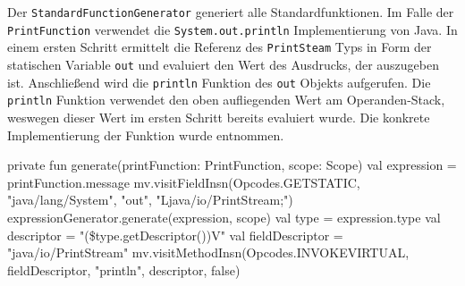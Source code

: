Der \texttt{StandardFunctionGenerator} generiert alle Standardfunktionen. Im Falle der \texttt{PrintFunction} verwendet \toya die \texttt{System.out.println} Implementierung von Java. In einem ersten Schritt ermittelt \toya die Referenz des \texttt{PrintSteam} Typs in Form der statischen Variable \texttt{out} und evaluiert \toya den Wert des Ausdrucks, der auszugeben ist. Anschließend wird die \texttt{println} Funktion des \texttt{out} Objekts aufgerufen. Die \texttt{println} Funktion verwendet den oben aufliegenden Wert am Operanden-Stack, weswegen dieser Wert im ersten Schritt bereits evaluiert wurde. Die konkrete Implementierung der Funktion wurde \textcite{enkelTutorial} entnommen.

\begin{KotlinCode}[numbers=none, caption={Bytecode zum Aufruf der \texttt{println} Funktion von Java}]
private fun generate(printFunction: PrintFunction, scope: Scope) {
    val expression = printFunction.message
    mv.visitFieldInsn(Opcodes.GETSTATIC, "java/lang/System", "out", "Ljava/io/PrintStream;")
    expressionGenerator.generate(expression, scope)
    val type = expression.type
    val descriptor = "(\${type.getDescriptor()})V"
    val fieldDescriptor = "java/io/PrintStream"
    mv.visitMethodInsn(Opcodes.INVOKEVIRTUAL, fieldDescriptor, "println", descriptor, false)
}
\end{KotlinCode}